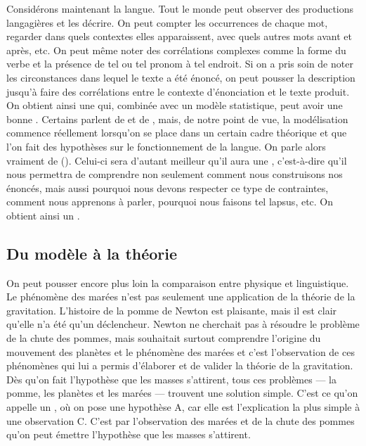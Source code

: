 Considérons maintenant la langue. Tout le monde peut observer des productions langagières et les décrire. On peut compter les occurrences de chaque mot, regarder dans quels contextes elles apparaissent, avec quels autres mots avant et après, etc. On peut même noter des corrélations complexes comme la forme du verbe et la présence de tel ou tel pronom à tel endroit. Si on a pris soin de noter les circonstances dans lequel le texte a été énoncé, on peut pousser la description jusqu’à faire des corrélations entre le contexte d’énonciation et le texte produit. On obtient ainsi une  qui, combinée avec un modèle statistique, peut avoir une bonne . Certains parlent de  et de , mais, de notre point de vue, la modélisation commence réellement lorsqu’on se place dans un certain cadre théorique et que l’on fait des hypothèses sur le fonctionnement de la langue. On parle alors vraiment de  (). Celui-ci sera d’autant meilleur qu’il aura une , c’est-à-dire qu’il nous permettra de comprendre non seulement comment nous construisons nos énoncés, mais aussi pourquoi nous devons respecter ce type de contraintes, comment nous apprenons à parler, pourquoi nous faisons tel lapsus, etc. On obtient ainsi un .

\subsection{ Du modèle à la théorie}

On peut pousser encore plus loin la comparaison entre physique et linguistique. Le phénomène des marées n’est pas seulement une application de la théorie de la gravitation. L’histoire de la pomme de Newton est plaisante, mais il est clair qu’elle n’a été qu’un déclencheur. Newton ne cherchait pas à résoudre le problème de la chute des pommes, mais souhaitait surtout comprendre l’origine du mouvement des planètes et le phénomène des marées et c’est l’observation de ces phénomènes qui lui a permis d’élaborer et de valider la théorie de la gravitation. Dès qu’on fait l’hypothèse que les masses s’attirent, tous ces problèmes — la pomme, les planètes et les marées — trouvent une solution simple. C’est ce qu’on appelle un , où on pose une hypothèse A, car elle est l’explication la plus simple à une observation C. C’est par l’observation des marées et de la chute des pommes qu’on peut émettre l’hypothèse que les masses s’attirent.

